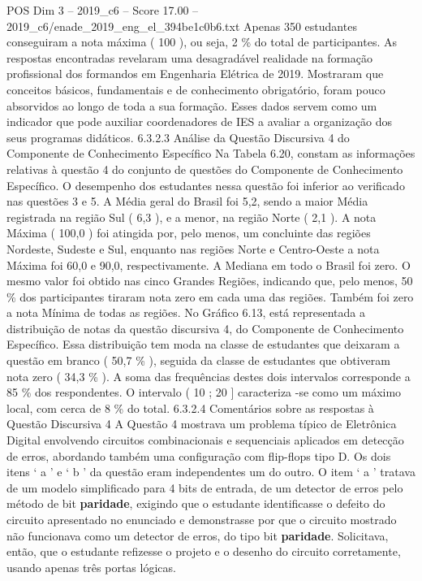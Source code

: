 \begin{textsample}{POS Dim 3 – 2019\_c6 – Score 17.00 – 2019\_c6/enade\_2019\_eng\_el\_394be1c0b6.txt}
Apenas 350 estudantes conseguiram a nota máxima ( 100 ), ou seja, 2 \% do total de participantes.
As respostas encontradas revelaram uma desagradável realidade na formação profissional dos formandos em Engenharia Elétrica de 2019.
Mostraram que conceitos básicos, fundamentais e de conhecimento obrigatório, foram pouco absorvidos ao longo de toda a sua formação.
Esses dados servem como um indicador que pode auxiliar coordenadores de IES a avaliar a organização dos seus programas didáticos. 6.3.2.3 Análise da Questão Discursiva 4 do Componente de Conhecimento Específico Na Tabela 6.20, constam as informações relativas à questão 4 do conjunto de questões do Componente de Conhecimento Específico.
O desempenho dos estudantes nessa questão foi inferior ao verificado nas questões 3 e 5.
A Média geral do Brasil foi 5,2, sendo a maior Média registrada na região Sul ( 6,3 ), e a menor, na região Norte ( 2,1 ).
A nota Máxima ( 100,0 ) foi atingida por, pelo menos, um concluinte das regiões Nordeste, Sudeste e Sul, enquanto nas regiões Norte e Centro-Oeste a nota Máxima foi 60,0 e 90,0, respectivamente.
A Mediana em todo o Brasil foi zero.
O mesmo valor foi obtido nas cinco Grandes Regiões, indicando que, pelo menos, 50 \% dos participantes tiraram nota zero em cada uma das regiões.
Também foi zero a nota Mínima de todas as regiões.
No Gráfico 6.13, está representada a distribuição de notas da questão discursiva 4, do Componente de Conhecimento Específico.
Essa distribuição tem moda na classe de estudantes que deixaram a questão em branco ( 50,7 \% ), seguida da classe de estudantes que obtiveram nota zero ( 34,3 \% ).
A soma das frequências destes dois intervalos corresponde a 85 \% dos respondentes.
O intervalo ( 10 ; 20 ] caracteriza -se como um máximo local, com cerca de 8 \% do total. 6.3.2.4 Comentários sobre as respostas à Questão Discursiva 4 A Questão 4 mostrava um problema típico de Eletrônica Digital envolvendo circuitos combinacionais e sequenciais aplicados em detecção de erros, abordando também uma configuração com flip-flops tipo D.
Os dois itens ‘ a ’ e ‘ b ’ da questão eram independentes um do outro.
O item ‘ a ’ tratava de um modelo simplificado para 4 bits de entrada, de um detector de erros pelo método de bit \textbf{paridade}, exigindo que o estudante identificasse o defeito do circuito apresentado no enunciado e demonstrasse por que o circuito mostrado não funcionava como um detector de erros, do tipo bit \textbf{paridade}.
Solicitava, então, que o estudante refizesse o projeto e o desenho do circuito corretamente, usando apenas três portas lógicas.

\end{textsample}
